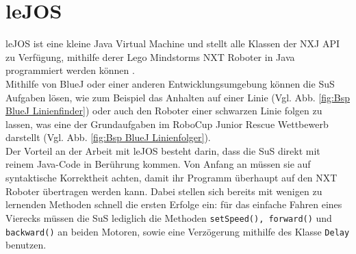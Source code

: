 \documentclass[paper=a4, pagesize, DIV=calc, BCOR=12.5mm, twoside=on, onecolumn=on, open = any, titlepage =on, parskip =half-, headsepline = on, footsepline = on, chapterprefix = on, appendixprefix = off, fontsize = 12pt, numbers = noenddot, abstract = on]{scrbook}
\numberwithin{equation}{chapter}
\theoremstyle{definition}
\theoremstyle{plain}
\theoremstyle{plain}
\theoremstyle{remark}
\theoremstyle{plain}
\theoremstyle{plain}
\begin{document}
\par \singlespacing
\section{leJOS}
\label{sec:lejos}
\onehalfspacing
leJOS ist eine kleine Java Virtual Machine und stellt alle Klassen der NXJ API zu Verfügung, mithilfe derer Lego Mindstorms NXT Roboter in Java programmiert werden können \cite{lejos}.\\
Mithilfe von BlueJ oder einer anderen Entwicklungsumgebung können die SuS Aufgaben lösen, wie zum Beispiel das Anhalten auf einer Linie (Vgl. Abb. \ref{fig:Bsp BlueJ Linienfinder}) oder auch den Roboter einer schwarzen Linie folgen zu lassen, was eine der Grundaufgaben im RoboCup Junior Rescue Wettbewerb darstellt (Vgl. Abb. \ref{fig:Bsp BlueJ Linienfolger}).\\
Der Vorteil an der Arbeit mit leJOS besteht darin, dass die SuS direkt mit reinem Java-Code in Berührung kommen. Von Anfang an müssen sie auf syntaktische Korrektheit achten, damit ihr Programm überhaupt auf den NXT Roboter übertragen werden kann. Dabei stellen sich bereits mit wenigen zu lernenden Methoden schnell die ersten Erfolge ein: für das einfache Fahren eines Vierecks müssen die SuS lediglich die  Methoden \texttt{setSpeed(), forward()} und \texttt{backward()} an beiden Motoren, sowie eine Verzögerung mithilfe des Klasse \texttt{Delay} benutzen. 


\par \singlespacing
\end{document}

